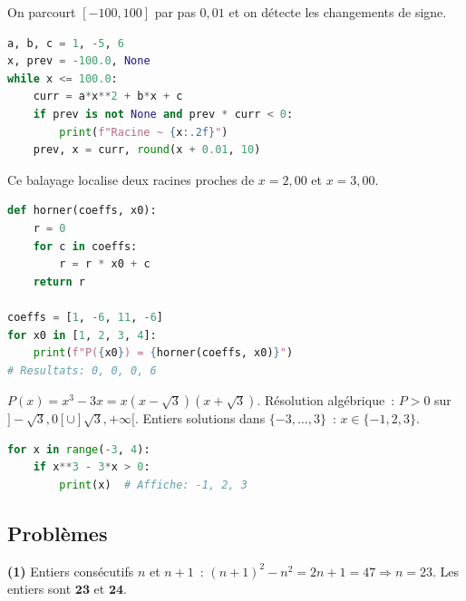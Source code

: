 
On parcourt $[-100,100]$ par pas $0{,}01$ et on d\'etecte les changements de signe.

\begin{lstlisting}[language=Python]
a, b, c = 1, -5, 6
x, prev = -100.0, None
while x <= 100.0:
    curr = a*x**2 + b*x + c
    if prev is not None and prev * curr < 0:
        print(f"Racine ~ {x:.2f}")
    prev, x = curr, round(x + 0.01, 10)
\end{lstlisting}
Ce balayage localise deux racines proches de $x=2{,}00$ et $x=3{,}00$.


\begin{lstlisting}[language=Python]
def horner(coeffs, x0):
    r = 0
    for c in coeffs:
        r = r * x0 + c
    return r

coeffs = [1, -6, 11, -6]
for x0 in [1, 2, 3, 4]:
    print(f"P({x0}) = {horner(coeffs, x0)}")
# Resultats: 0, 0, 0, 6
\end{lstlisting}


$P(x)=x^3-3x=x(x-\sqrt{3})(x+\sqrt{3})$. R\'esolution alg\'ebrique~:
$P>0$ sur $]-\sqrt{3},0[\cup]\sqrt{3},+\infty[$.
Entiers solutions dans $\{-3,\ldots,3\}$~: $x\in\{-1,2,3\}$.

\begin{lstlisting}[language=Python]
for x in range(-3, 4):
    if x**3 - 3*x > 0:
        print(x)  # Affiche: -1, 2, 3
\end{lstlisting}

\subsection*{Probl\`emes}


\textbf{(1)} Entiers cons\'ecutifs $n$ et $n+1$~: $(n+1)^2-n^2=2n+1=47\Rightarrow n=23$.
Les entiers sont $\mathbf{23}$ et $\mathbf{24}$.

